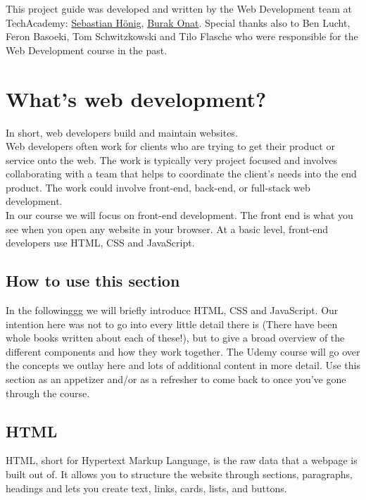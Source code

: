 \documentclass[
]{article}
\begin{document}
This project guide was developed and written by the Web Development team at TechAcademy: \href{https://www.linkedin.com/in/sebastian-hönig/}{Sebastian Hönig}, \href{https://www.linkedin.com/in/tburakonat/}{Burak Onat}. Special thanks also to Ben Lucht, Feron Basoeki, Tom Schwitzkowski and Tilo Flasche who were responsible for the Web Development course in the past.

\hypertarget{whats-web-development}{%
\section{What's web development?}\label{whats-web-development}}

In short, web developers build and maintain websites.\\
Web developers often work for clients who are trying to get their product or service onto the web. The work is typically very project focused and involves collaborating with a team that helps to coordinate the client's needs into the end product. The work could involve front-end, back-end, or full-stack web development.\\
In our course we will focus on front-end development. The front end is what you see when you open any website in your browser. At a basic level, front-end developers use HTML, CSS and JavaScript.

\hypertarget{how-to-use-this-section}{%
\subsection{How to use this section}\label{how-to-use-this-section}}

In the followinggg we will briefly introduce HTML, CSS and JavaScript. Our intention here was not to go into every little detail there is (There have been whole books written about each of these!), but to give a broad overview of the different components and how they work together. The Udemy course will go over the concepts we outlay here and lots of additional content in more detail. Use this section as an appetizer and/or as a refresher to come back to once you've gone through the course.

\hypertarget{html}{%
\subsection{HTML}\label{html}}

HTML, short for Hypertext Markup Language, is the raw data that a webpage is built out of. It allows you to structure the website through sections, paragraphs, headings and lets you create text, links, cards, lists, and buttons.
\end{document}
